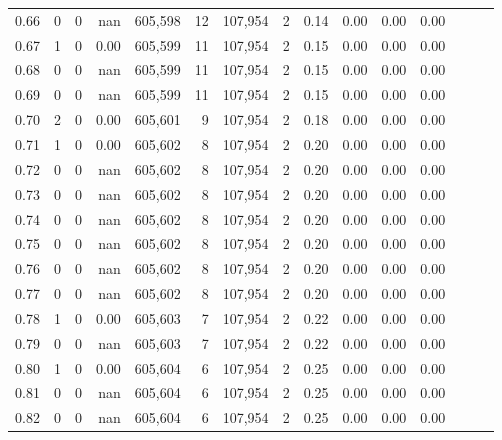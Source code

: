 \begin{tabular}{rrrrrrrrrrrrrrr}
0.66 &       0 &      0 &   nan &  605,598 &       12 &  107,954 &        2 &  0.14 &  0.00 &  0.00 &      0.00 \\
0.67 &       1 &      0 &  0.00 &  605,599 &       11 &  107,954 &        2 &  0.15 &  0.00 &  0.00 &      0.00 \\
0.68 &       0 &      0 &   nan &  605,599 &       11 &  107,954 &        2 &  0.15 &  0.00 &  0.00 &      0.00 \\
0.69 &       0 &      0 &   nan &  605,599 &       11 &  107,954 &        2 &  0.15 &  0.00 &  0.00 &      0.00 \\
0.70 &       2 &      0 &  0.00 &  605,601 &        9 &  107,954 &        2 &  0.18 &  0.00 &  0.00 &      0.00 \\
0.71 &       1 &      0 &  0.00 &  605,602 &        8 &  107,954 &        2 &  0.20 &  0.00 &  0.00 &      0.00 \\
0.72 &       0 &      0 &   nan &  605,602 &        8 &  107,954 &        2 &  0.20 &  0.00 &  0.00 &      0.00 \\
0.73 &       0 &      0 &   nan &  605,602 &        8 &  107,954 &        2 &  0.20 &  0.00 &  0.00 &      0.00 \\
0.74 &       0 &      0 &   nan &  605,602 &        8 &  107,954 &        2 &  0.20 &  0.00 &  0.00 &      0.00 \\
0.75 &       0 &      0 &   nan &  605,602 &        8 &  107,954 &        2 &  0.20 &  0.00 &  0.00 &      0.00 \\
0.76 &       0 &      0 &   nan &  605,602 &        8 &  107,954 &        2 &  0.20 &  0.00 &  0.00 &      0.00 \\
0.77 &       0 &      0 &   nan &  605,602 &        8 &  107,954 &        2 &  0.20 &  0.00 &  0.00 &      0.00 \\
0.78 &       1 &      0 &  0.00 &  605,603 &        7 &  107,954 &        2 &  0.22 &  0.00 &  0.00 &      0.00 \\
0.79 &       0 &      0 &   nan &  605,603 &        7 &  107,954 &        2 &  0.22 &  0.00 &  0.00 &      0.00 \\
0.80 &       1 &      0 &  0.00 &  605,604 &        6 &  107,954 &        2 &  0.25 &  0.00 &  0.00 &      0.00 \\
0.81 &       0 &      0 &   nan &  605,604 &        6 &  107,954 &        2 &  0.25 &  0.00 &  0.00 &      0.00 \\
0.82 &       0 &      0 &   nan &  605,604 &        6 &  107,954 &        2 &  0.25 &  0.00 &  0.00 &      0.00 \\

\end{tabular}
